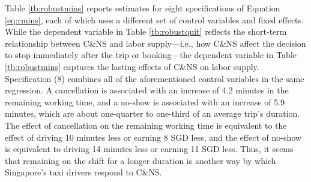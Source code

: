 \documentclass[reviewmode,AEJ]{AEA}
\begin{document}

Table \ref{tb:robustmins} reports estimates for eight specifications of Equation \eqref{eq:rmins},
each of which uses a different set of control variables and fixed effects. While the dependent variable
in Table \ref{tb:robustquit} reflects the short-term relationship between C\&NS and labor supply---i.e., 
how C\&NS affect the decision to stop immediately after the trip or booking---the dependent variable
in Table \ref{tb:robustmins} captures the lasting effects of C\&NS on labor supply. %
Specification (8) combines all of the aforementioned  control variables in the same regression. 
A cancellation is associated with an increase of 4.2 minutes in the remaining working time, and a no-show
is associated with an increase of 5.9 minutes, which are about one-quarter to one-third of an average 
trip's duration. The effect of cancellation on the remaining working time is equivalent to the effect of
driving 10 minutes less or earning 8 SGD less, and the effect of no-show is equivalent to driving 14 minutes
less or earning 11 SGD less. 
 Thus, it seems that remaining on the shift for a longer duration is another way by which Singapore's taxi 
 drivers respond to C\&NS.
\end{document}
